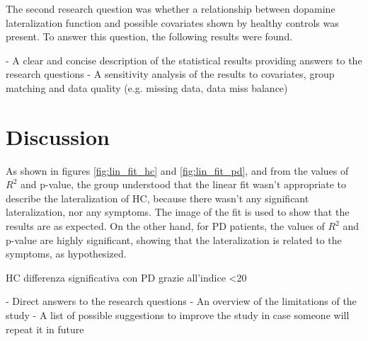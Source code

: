 \documentclass[]{article}
\begin{document}
\begin{multicols}{2}

The second research question was whether a relationship between dopamine lateralization function and possible covariates shown by healthy controls was present. To answer this question, the following results were found. 





- A clear and concise description of the statistical results 
providing answers to the research questions
\newline
- A sensitivity analysis of the results to covariates, group matching and data quality (e.g. missing data, data miss balance)

\section{Discussion}

As shown in figures \ref{fig:lin_fit_hc} and \ref{fig:lin_fit_pd}, and from the values of $R^2$ and p-value, the group understood that the linear fit wasn't appropriate to describe the lateralization of HC, because there wasn't any significant lateralization, nor any symptoms. The image of the fit is used to show that the results are as expected. 
On the other hand, for PD patients, the values of $R^2$ and p-value are highly significant, showing that the lateralization is related to the symptoms, as hypothesized. 


HC differenza significativa con PD grazie all'indice <20 


- Direct answers to the research questions
\newline
- An overview of the limitations of the study
\newline
- A list of possible suggestions to improve the study in case 
someone will repeat it in future

\end{multicols}

\printbibliography
\end{document}
